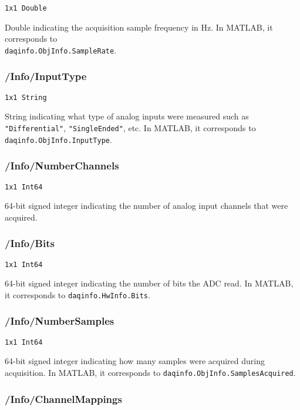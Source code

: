 \documentclass[12pt]{article} %
\begin{document}
\verb|1x1 Double|

Double indicating the acquisition sample frequency in Hz.
In MATLAB\textsuperscript{\textregistered}, it corresponds to \\ \verb|daqinfo.ObjInfo.SampleRate|.



\subsubsection{/Info/InputType}

\verb|1x1 String|

String indicating what type of analog inputs were measured such as \verb|"Differential"|, \verb|"SingleEnded"|, etc.
In MATLAB\textsuperscript{\textregistered}, it corresponds to \verb|daqinfo.ObjInfo.InputType|.



\subsubsection{/Info/NumberChannels}

\verb|1x1 Int64|

64-bit signed integer indicating the number of analog input channels that were acquired.



\subsubsection{/Info/Bits}

\verb|1x1 Int64|

64-bit signed integer indicating the number of bits the ADC read.
In MATLAB\textsuperscript{\textregistered}, it corresponds to \verb|daqinfo.HwInfo.Bits|.



\subsubsection{/Info/NumberSamples}

\verb|1x1 Int64|

64-bit signed integer indicating how many samples were acquired during acquisition.
In MATLAB\textsuperscript{\textregistered}, it corresponds to \verb|daqinfo.ObjInfo.SamplesAcquired|.



\subsubsection{/Info/ChannelMappings}
\end{document}
